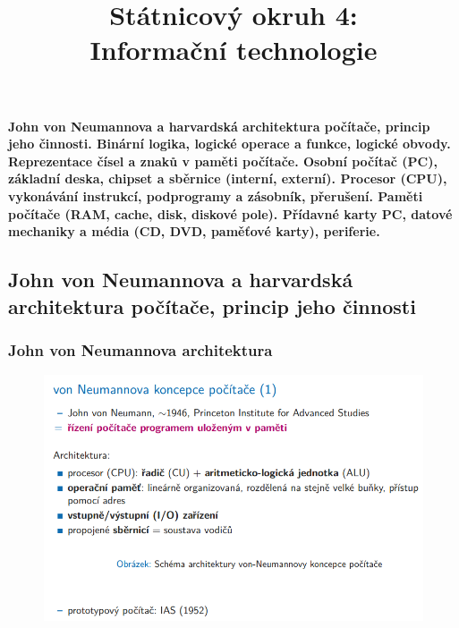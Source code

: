 \documentclass[10pt,a4paper]{article}
\begin{document}
\title{Státnicový okruh 4: \\ Informační technologie}
\maketitle
\newpage
\tableofcontents
\newpage
\section{}
\paragraph{John von Neumannova a harvardská architektura počítače, princip jeho činnosti. Binární logika, logické operace a funkce, logické obvody. Reprezentace čísel a znaků v paměti počítače. Osobní počítač (PC), základní deska, chipset a sběrnice (interní, externí). Procesor (CPU), vykonávání instrukcí, podprogramy a zásobník, přerušení. Paměti počítače (RAM, cache, disk, diskové pole). Přídavné karty PC, datové mechaniky a média (CD, DVD, paměťové karty), periferie.}


\subsection{John von Neumannova a harvardská architektura počítače, princip jeho činnosti}

\subsubsection{John von Neumannova architektura}
\begin{figure} [h]
	\includegraphics[scale=0.65]{img/prvni_odstavec/otazka1/von_neuman1.png}	
\end{figure}
\end{document}
